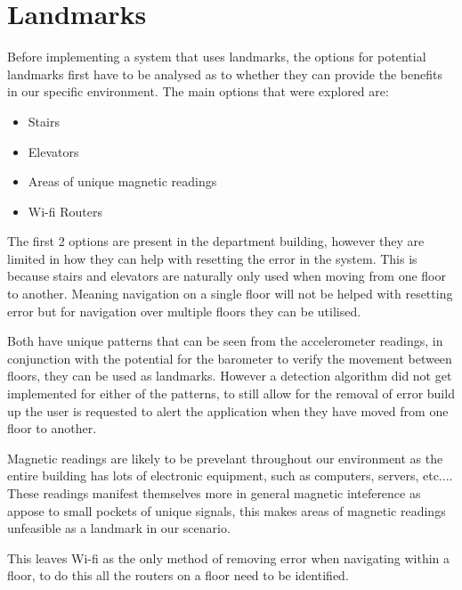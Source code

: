 \documentclass[main.tex]{subfiles}
\begin{document}
\section{Landmarks}

Before implementing a system that uses landmarks, the options for potential landmarks first have to be analysed as to whether they can provide the benefits in our specific environment. The main options that were explored are:

\begin{itemize}
	\item Stairs
	\item Elevators
	\item Areas of unique magnetic readings
	\item Wi-fi Routers
\end{itemize}

The first 2 options are present in the department building, however they are limited in how they can help with resetting the error in the system. This is because stairs and elevators are naturally only used when moving from one floor to another. Meaning navigation on a single floor will not be helped with resetting error but for navigation over multiple floors they can be utilised. 

Both have unique patterns that can be seen from the accelerometer readings, in conjunction with the potential for the barometer to verify the movement between floors, they can be used as landmarks. However a detection algorithm did not get implemented for either of the patterns, to still allow for the removal of error build up the user is requested to alert the application when they have moved from one floor to another.

Magnetic readings are likely to be prevelant throughout our environment as the entire building has lots of electronic equipment, such as computers, servers, etc.... These readings manifest themselves more in general magnetic inteference as appose to small pockets of unique signals, this makes areas of magnetic readings unfeasible as a landmark in our scenario.

This leaves Wi-fi as the only method of removing error when navigating within a floor, to do this all the routers on a floor need to be identified.
\end{document}
